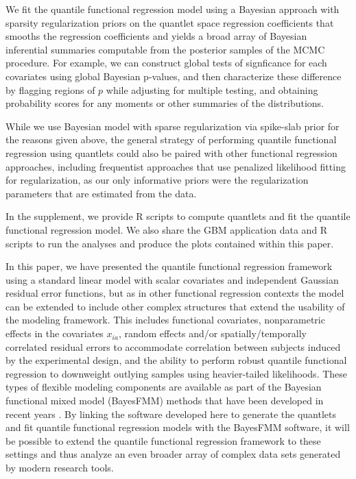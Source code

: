 \documentclass[11pt]{article}
\begin{document}
We fit the quantile functional  regression model using a Bayesian approach with sparsity regularization priors on the quantlet space regression coefficients that smooths the regression coefficients and yields a broad array of Bayesian inferential summaries computable from the posterior samples of the MCMC procedure.   
For example, we can construct global tests of signficance for each covariates using global Bayesian p-values, and then characterize these difference by flagging regions of $p$ while adjusting for multiple testing, and obtaining probability scores for any moments or other summaries of the distributions.   


While we use Bayesian model with sparse regularization via spike-slab prior for the reasons given above, the general strategy of performing quantile functional regression using quantlets could also be paired with other functional regression approaches, including frequentist approaches that use penalized likelihood fitting for regularization, as our only informative priors were the regularization parameters that are estimated from the data.

In the supplement, we provide R scripts to compute quantlets and fit the quantile functional regression model.  We also share the GBM application data and R scripts to run the analyses and produce the plots contained within this paper.

In this paper, we have presented the quantile functional regression framework using a standard linear model with scalar covariates and independent Gaussian residual error functions, but as in other functional regression contexts the model can be extended to include other complex structures that extend the usability of the modeling framework.  This includes functional covariates, nonparametric effects in the covariates $x_{ia}$, random effects and/or spatially/temporally correlated residual errors to accommodate correlation between subjects induced by the experimental design, and the ability to perform robust quantile functional regression to downweight outlying samples using heavier-tailed likelihoods. These types of flexible modeling components are available as part of the Bayesian functional mixed model (BayesFMM) methods that have been developed in recent years
\cite{morris2006wavelet,zhu2011robust,zhu2012robust,meyer2015bayesian,zhang2016functional,Zhu2017robustf,lee2016semiparametric}.
By linking the software developed here to generate the quantlets and fit quantile functional regression models with the BayesFMM software, it will be possible to extend the quantile functional regression framework to these settings and thus analyze an even broader array of complex data sets generated by modern research tools.  
\end{document}
